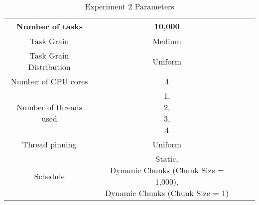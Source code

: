\begin{table}
\centering
 \begin{tabular}{|c|c|c|c|}
  \hline
  Number of tasks & 10,000 \\
  \hline
  Task Grain & Medium \\
  \hline
  Task Grain Distribution & Uniform \\
  \hline
  Number of CPU cores & 4 \\
  \hline
  Number of threads used & \specialcell{1, \\ 2, \\ 3, \\ 4} \\
  \hline
  Thread pinning & Uniform \\
  \hline
  Schedule & \specialcell{Static, \\ Dynamic Chunks (Chunk Size = 1,000), \\ Dynamic Chunks (Chunk Size = 1)} \\
  \hline
 \end{tabular}
\caption{Experiment 2 Parameters}
\iflabelb
\label{table:evaluation_ex2_parameters}
\fi
{}
\end{table}
